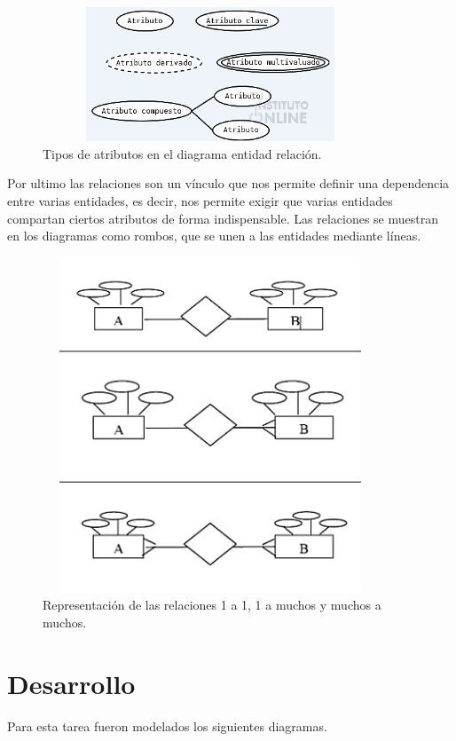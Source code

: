 \documentclass[12pt, titlepage]{article}
\begin{document}
	\begin{figure}[H]
		\begin{center}
			\includegraphics[width=10cm, height=4cm]{img/atributo.png}
			\caption{Tipos de atributos en el diagrama entidad relación.}
			\label{fig:hasta-use2}
		\end{center}
	\end{figure}
	
	Por ultimo las relaciones son un vínculo que nos permite definir una dependencia entre varias entidades, es decir, nos permite exigir que varias entidades compartan ciertos atributos de forma indispensable. Las relaciones se muestran en los diagramas como rombos, que se unen a las entidades mediante líneas.
	\begin{figure}[H]
		\begin{center}
			\includegraphics[width=10cm, height=10cm]{img/relaciones.png}
			\caption{Representación de las relaciones 1 a 1, 1 a muchos y muchos a muchos.}
			\label{fig:hasta-use3}
		\end{center}
	\end{figure}
\newpage
	\section{Desarrollo}
	Para esta tarea fueron modelados los siguientes diagramas.
\end{document}
